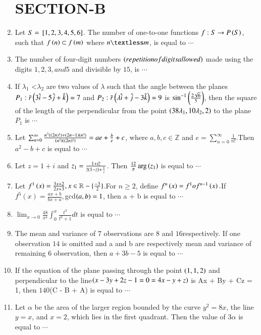 \documentclass[journal,12pt,twocolumn]{IEEEtran}
\theoremstyle{remark}
\begin{document}
\begin{enumerate}[start=16]
\section{SECTION-B}
\item Let $S = {}\left[1, 2, 3, 4, 5, 6\right]$. The number of one-to-one functions $f : S \to P\left(S\right)$, such that $f\left(n\right) \subset f\left(m\right)$ where $n \textless m$, is equal to $\cdots$
\item The number of four-digit numbers $\left(repetition of digits allowed\right)$ made using the digits $1, 2, 3, and 5$ and divisible by $15$, is $\cdots$
\item If $\lambda_1$ \textless$ \lambda_2$ are two values of $\lambda$ such that the angle between the planes $P_1:\Bar{r}\left(3\hat{i} - 5\hat{j} + \hat{k} \right)= 7$ and $P_2: \Bar{r}\left(\lambda \hat{i} +\hat{j} - 3\hat{k}\right) = 9$ is 
$\sin^{-1}\left(\frac{2\sqrt{6}}{5}\right)$, then the square of the length of the perpendicular from the point $\left(38\lambda_1, 10\lambda_2, 2\right)$ to the plane $P_1$ is $\cdots$
\item Let $\sum_{n=0}^{\infty} \frac{n^3\left(\left(2n\right)!\right)+\left(2n-1\right)\left(n!\right)}{\left(n!\right)\left(\left(2n\right)!\right)} = ae+\frac{b}{e}+c$, where $a, b, c \in \mathbb{Z}$ and $e=\sum_{n=0}^{\infty}\frac{1}{n!}$.Then $a^2 - b + c$ is equal to $\cdots$
\item Let $ z = 1 + i $ and $z_1=\frac{1+i\Bar{z}}{\Bar{z}\left(1-z\right)+\frac{1}{z}}$. Then $\frac{12}{\pi}\arg\left(z_1\right)$ is equal to $\cdots$
\item Let $f^1\left(x\right) =\frac{3x+2}{2x+3} , x \in \mathbb{R}-\{\frac{-3}{2}\}$.For $ n \geq 2 $, define $f^n\left(x\right) = f^1of^{n-1}\left(x\right).$If$ f^5(x) = \frac{ax + b}{bx + a},$gcd$\left(a, b\right) = 1$,
then  a + b  is equal to $\cdots$
\item $\lim_{x \to 0} \frac{48}{x^4} \int_0^{x} \frac{t^3}{t^6+1}dt$ is equal to $\cdots$
\item The mean and variance of $7$ observations are $8$ and
$16$respectively. If one observation $14$ is omitted
and a and b are respectively mean and variance of
remaining $6$ observation, then $a + 3b -5$ is equal to $\cdots$
\item If the equation of the plane passing through the
point $\left(1, 1, 2\right)$ and perpendicular to the line$\left( x - 3y +
2z - 1 = 0 = 4x - y + z\right)$ is Ax + By + Cz = 1, then
$140$(C - B + A) is equal to $\cdots$
\item Let $\alpha$ be the area of the larger region bounded by the curve $y^2 = 8x$, the line $y = x$, and $x = 2$, which lies in the first quadrant. Then the value of $3\alpha$ is equal to $\cdots$





    
\end{enumerate}
\end{document}
